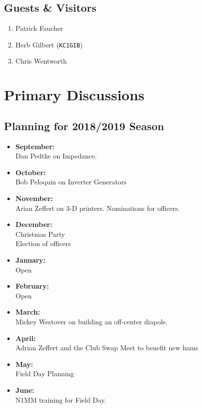\documentclass[10pt,letterpaper]{article}
\begin{document}

\subsection{Guests \& Visitors}
\begin{enumerate}
  \item Patrick Faucher
  \item Herb Gilbert (\texttt{KC1GIB})
  \item Chris Wentworth
\end{enumerate}

\section{Primary Discussions}

\subsection{Planning for 2018/2019 Season}
\begin{itemize}
\item \textbf{September:}\\
Dan Pedtke on Impedance.
\item \textbf{October:}\\
Bob Peloquin on Inverter Generators
\item \textbf{November:}\\
Arian Zeffert on 3-D printers.
Nominations for officers.
\item \textbf{December:}\\
Christmas Party\\
Election of officers
\item \textbf{January:}\\
Open
\item \textbf{February:}\\
Open
\item \textbf{March:}\\
Mickey Westover on building an off-center diapole.
\item \textbf{April:}\\
Adrian Zeffert and the Club Swap Meet to benefit new hams
\item \textbf{May:}\\
Field Day Planning
\item \textbf{June:}\\
N1MM training for Field Day.
\end{itemize}
\end{document}
